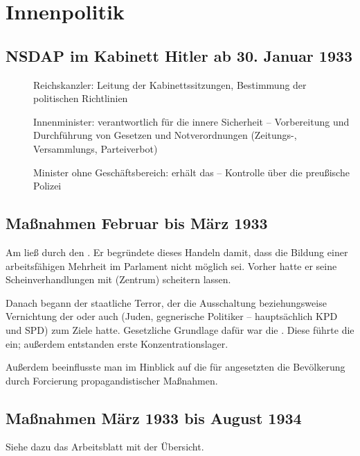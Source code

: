 \section{Innenpolitik}

\subsection*{NSDAP im Kabinett Hitler ab 30. Januar 1933}

\begin{description}
\item[] Reichskanzler: Leitung der
Kabinettssitzungen, Bestimmung der politischen Richtlinien 

\item[] Innenminister: verantwortlich für
die innere Sicherheit -- Vorbereitung und Durchführung von Gesetzen
und Notverordnungen (Zeitungs-, Versammlungs, Parteiverbot)

\item[] Minister ohne Geschäftsbereich:
erhält das  -- Kontrolle über die preußische Polizei
\end{description}


\subsection*[Maßnahmen Februar bis März 1933]{Maßnahmen Februar bis
März 1933}

Am  ließ  durch
 den .
Er begründete dieses Handeln damit, dass die Bildung einer
arbeitsfähigen Mehrheit im Parlament nicht möglich sei. Vorher hatte
er seine Scheinverhandlungen mit 
(Zentrum) scheitern lassen.

Danach begann der staatliche Terror, der die Ausschaltung
beziehungsweise Vernichtung der  oder auch
 (Juden, gegnerische Politiker -- hauptsächlich KPD
und SPD) zum Ziele hatte. Gesetzliche Grundlage dafür war die
. Diese führte
die  ein; außerdem entstanden erste
Konzentrationslager.

Außerdem beeinflusste man im Hinblick auf die für 
angesetzten  die Bevölkerung durch Forcierung
propagandistischer Maßnahmen.


\subsection*[Maßnahmen März 1933 bis August 1934]{Maßnahmen März 1933
bis August 1934}

Siehe dazu das Arbeitsblatt mit der Übersicht.

\endinput
